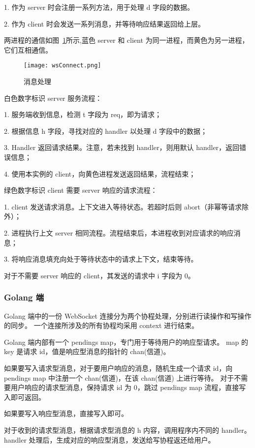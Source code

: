 \quad{}1. 作为 server 时会注册一系列方法，用于处理 d 字段的数据。

\quad{}2. 作为 client 时会发送一系列消息，并等待响应结果返回给上层。

两进程的通信如图~\ref{fig:wsConnect}所示,蓝色 server 和 client 为同一进程，而黄色为另一进程，它们互相通信。
\begin{figure}[!htp]
    \centering
    \texttt{[image: wsConnect.png]}
    \caption{消息处理}
    \label{fig:wsConnect}
  \end{figure}

白色数字标识 server 服务流程：

\quad{}1. 服务端收到信息，检测 t 字段为 req，即为请求；

\quad{}2. 根据信息 h 字段，寻找对应的 handler 以处理 d 字段中的数据；

\quad{}3. Handler 返回请求结果。注意，若未找到 handler，则用默认 handler，返回错误信息；

\quad{}4. 使用本实例的 client，向黄色进程发送返回结果，流程结束；

绿色数字标识 client 需要 server 响应的请求流程：

\quad{}1. client 发送请求消息。上下文进入等待状态。若超时后则 abort（非幂等请求除外）；

\quad{}2. 进程执行上文 server 相同流程。流程结束后，本进程收到对应请求的响应消息；

\quad{}3. 将响应消息填充向处于等待状态中的请求上下文，结束等待。

对于不需要 server 响应的 client，其发送的请求中 i 字段为 0。

\subsubsection{Golang 端}
Golang 端中的一份 WebSocket 连接分为两个协程处理，分别进行读操作和写操作的同步。
一个连接所涉及的所有协程均采用 context 进行结束。

Golang 端内部有一个 pendings map，专门用于等待用户的响应型请求。
map 的 key 是请求 id，值是响应型消息的指针的 chan(信道)。

如果要写入请求型消息，对于要用户响应的消息，随机生成一个请求 id，向 pendings map 中注册一个 chan(信道)，在该 chan(信道) 上进行等待。
对于不需要用户响应的请求型消息，保持请求 id 为 0，跳过 pendings map 流程，直接写入即可返回。

如果要写入响应型消息，直接写入即可。

对于收到的请求型消息，根据请求型消息的 h 内容，调用程序内不同的 handler。handler 处理后，生成对应的响应型消息，发送给写协程返还给用户。


